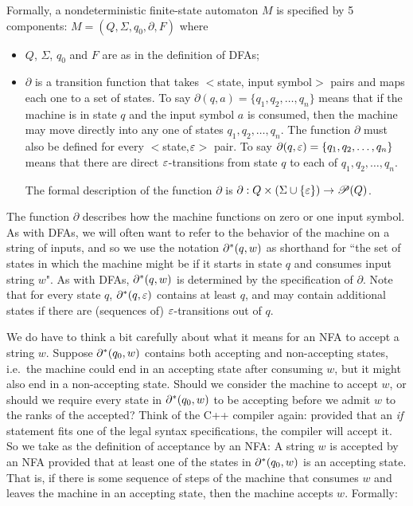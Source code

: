 \smallskip

\begin{definition}
Formally,
a nondeterministic finite-state automaton $M$ is specified by 5 components:
$M=(Q, \Sigma, q_0, \partial, F)$ where
\begin{itemize} 
\item  $Q$, $\Sigma$, $q_0 $ and $F$ are as in the definition of DFAs;
\item $\partial$ is a transition function that takes 
$<$state, input symbol$>$ pairs and maps each one to a set of states.  To say
$\partial(q,a) = \{q_1, q_2, \ldots , q_n\}$ means that
if the machine is in state $q$ and the input symbol $a$ is consumed, then the
machine may move directly into any one of states $q_1, q_2, \ldots , q_n$.  
The function $\partial$ must also be defined for every $<$state,$\varepsilon$$>$ pair.
To say
$\partial(q,\varepsilon) = \{q_1, q_2, \ldots , q_n\}$ means that there are direct
$\varepsilon$-transitions from state $q$ to each of  $q_1, q_2, \ldots , q_n$.


The formal description of the function $\partial$ is $\partial : Q \times
(\Sigma \cup \{\varepsilon\}) \rightarrow {\mathscr P}(Q)$.
\end{itemize}
\end{definition}


The function $\partial$ describes how the machine functions on zero or one 
input symbol. 
As with DFAs, we will often want to refer to the behavior of the machine on a
string of inputs, and so we use the notation $\partial^*(q,w)$ as shorthand
for ``the set of states in which
the machine might be if it starts in state $q$ and consumes input string $w$".  
As with DFAs, $\partial^*(q,w)$ is
determined by the specification of $\partial$.  Note that for every state $q$,
$\partial^*(q, \varepsilon)$ contains at least $q$, and may contain additional states if
there are (sequences of) $\varepsilon$-transitions out of $q$. 

We do have to think a bit carefully about what it means for an NFA to accept a
string $w$.  Suppose $\partial^*(q_0,w)$ contains both accepting and non-accepting
states, i.e.\ the machine could end in an accepting state after consuming $w$,
but it might also end in a non-accepting state.  Should we consider the machine
to accept $w$, or should we require every state in $\partial^*(q_0,w)$ to be
accepting before we admit $w$ to the ranks of the accepted?  Think of the C++
compiler again: provided that an {\em if} statement fits one of the legal
syntax specifications, the compiler will accept it.  So we take as the
definition of acceptance by an NFA: A string $w$ is accepted by an NFA provided
that at least one of the states in $\partial^*(q_0, w)$ is an accepting state. 
That is, if there is some sequence of steps of the machine that consumes $w$
and leaves the machine in an accepting state, then the machine accepts $w$.
Formally:

